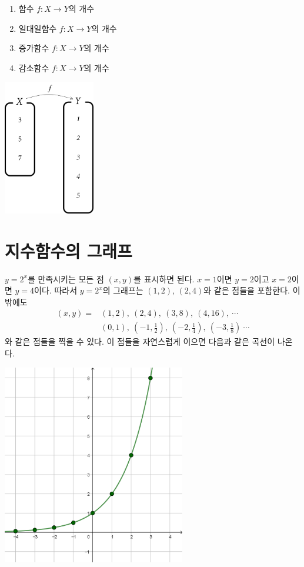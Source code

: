 \documentclass{oblivoir}
\begin{document}
%
\begin{enumerate}\label{review9}
\item
함수 \(f:X\to Y\)의 개수
\item
일대일함수 \(f:X\to Y\)의 개수
\item
증가함수 \(f:X\to Y\)의 개수
\item
감소함수 \(f:X\to Y\)의 개수
\end{enumerate}

\begin{center}
\includegraphics[width=0.3\textwidth]{review_9}
\end{center}

\section{지수함수의 그래프}

%
\label{exp1}
\begin{mdframed}
\(y=2^x\)를 만족시키는 모든 점 \((x,y)\)를 표시하면 된다.
\(x=1\)이면 \(y=2\)이고 \(x=2\)이면 \(y=4\)이다.
따라서 \(y=2^x\)의 그래프는 \((1,2)\), \((2,4)\)와 같은 점들을 포함한다.
이밖에도
\begin{align*}
(x,y)
=&\textstyle(1,2),\:(2,4),\:(3,8),\:(4,16),\:\cdots\\
&\textstyle(0,1),\:(-1,\frac12),\:(-2,\frac14),\:(-3,\frac18)\:\cdots
\end{align*}
와 같은 점들을 찍을 수 있다.
이 점들을 자연스럽게 이으면 다음과 같은 곡선이 나온다.
\begin{center}
\includegraphics[width=0.6\textwidth]{exp_1}
\end{center}
\end{mdframed}
\end{document}
